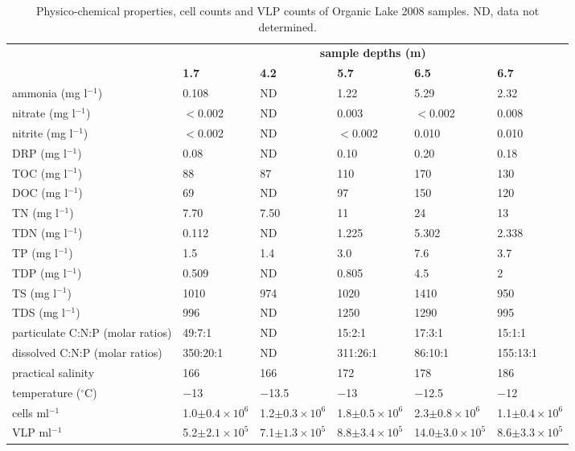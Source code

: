 \begin{table}
\footnotesize
\caption[Physico-chemical properties, cell counts and \ac{VLP} counts of Organic Lake 2008 samples]{Physico-chemical properties, cell counts and \ac{VLP} counts of Organic Lake 2008 samples. ND, data not determined.}
\label{tab:physico-chem}
\smallskip
\begin{tabularx}{\textwidth}{p{2.6cm}XXXXX}
\toprule
 & \multicolumn{5}{c}{\textbf{sample depths (m)}}\\
 & \textbf{1.7} & \textbf{4.2} & \textbf{5.7} & \textbf{6.5} & \textbf{6.7}\\
\midrule
ammonia (mg l$^{-1}$) & 0.108 & ND & 1.22 & 5.29 & 2.32 \\
nitrate (mg l$^{-1}$) & $<$0.002 & ND & 0.003 & $<$0.002 & 0.008 \\
nitrite (mg l$^{-1}$) & $<$0.002 & ND & $<$0.002 & 0.010 & 0.010 \\
\ac{DRP} (mg l$^{-1}$) & 0.08 & ND & 0.10 & 0.20 & 0.18 \\
\ac{TOC} (mg l$^{-1}$) & 88 & 87 & 110 & 170 & 130 \\
\ac{DOC} (mg l$^{-1}$) & 69 & ND & 97 & 150 & 120 \\
\ac{TN} (mg l$^{-1}$) & 7.70 & 7.50 & 11 & 24 & 13 \\
\ac{TDN} (mg l$^{-1}$) & 0.112 & ND & 1.225 & 5.302 & 2.338 \\
\ac{TP} (mg l$^{-1}$) & 1.5 & 1.4 & 3.0 & 7.6 & 3.7 \\
\ac{TDP} (mg l$^{-1}$) & 0.509 & ND & 0.805 & 4.5 & 2 \\
\ac{TS} (mg l$^{-1}$) & 1010 & 974 & 1020 & 1410 & 950 \\
\ac{TDS} (mg l$^{-1}$) & 996 & ND & 1250 & 1290 & 995 \\
particulate C:N:P (molar ratios) & 49:7:1 & ND & 15:2:1 & 17:3:1 & 15:1:1 \\
dissolved C:N:P (molar ratios) & 350:20:1 & ND & 311:26:1 & 86:10:1 & 155:13:1 \\
practical salinity & 166 & 166 & 172 & 178 & 186 \\
temperature ($^{\circ}$C) & $-$13 & $-$13.5 & $-$13 & $-$12.5 & $-$12 \\
cells ml$^{-1}$ & 1.0$\pm0.4 \times 10^6$ & 1.2$\pm0.3 \times 10^6$ & 1.8$\pm0.5 \times 10^6$ & 2.3$\pm0.8 \times 10^6$ & 1.1$\pm0.4 \times 10^6$ \\
\ac{VLP} ml$^{-1}$ & 5.2$\pm2.1 \times 10^5$ & 7.1$\pm1.3 \times 10^5$ & 8.8$\pm3.4 \times 10^5$ & 14.0$\pm3.0 \times 10^5$ & 8.6$\pm3.3 \times 10^5$ \\
\bottomrule
\end{tabularx}
\end{table}
